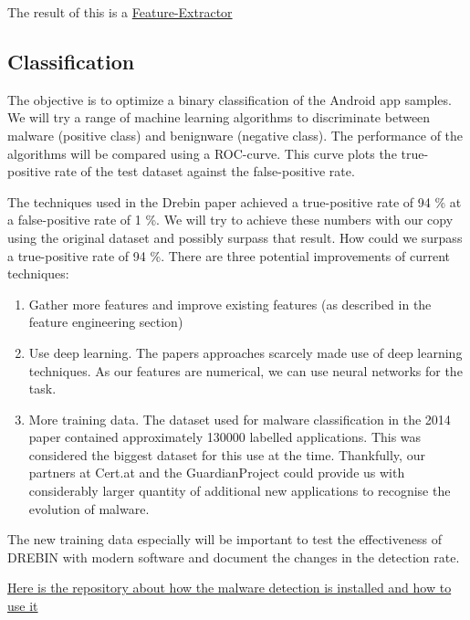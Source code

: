 The result of this is a
\href{https://github.com/33onethird/feature-extraction}{Feature-Extractor}

\subsection{Classification}\label{classification}

The objective is to optimize a binary classification of the Android app
samples. We will try a range of machine learning algorithms to
discriminate between malware (positive class) and benignware (negative
class). The performance of the algorithms will be compared using a
ROC-curve. This curve plots the true-positive rate of the test dataset
against the false-positive rate.

The techniques used in the Drebin paper achieved a true-positive rate of
94 \% at a false-positive rate of 1 \%. We will try to achieve these
numbers with our copy using the original dataset and possibly surpass
that result. How could we surpass a true-positive rate of 94 \%. There
are three potential improvements of current techniques:

\begin{enumerate}
	\def\labelenumi{\arabic{enumi}.}
	\item
	Gather more features and improve existing features (as described in
	the feature engineering section)
	\item
	Use deep learning. The papers approaches scarcely made use of deep
	learning techniques. As our features are numerical, we can use neural
	networks for the task.
	\item
	More training data. The dataset used for malware classification in the
	2014 paper contained approximately 130000 labelled applications. This
	was considered the biggest dataset for this use at the time.
	Thankfully, our partners at Cert.at and the GuardianProject could
	provide us with considerably larger quantity of additional new
	applications to recognise the evolution of malware.
\end{enumerate}

The new training data especially will be important to test the
effectiveness of DREBIN with modern software and document the changes in
the detection rate.

\href{https://github.com/33onethird/malware-test}{Here is the repository
	about how the malware detection is installed and how to use it}
